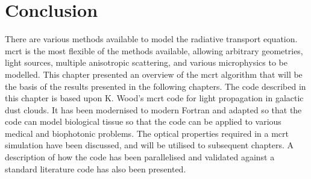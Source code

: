 \section{Conclusion}

There are various methods available to model the radiative transport equation.
\Gls*{mcrt} is the most flexible of the methods available, allowing arbitrary geometries, light sources, multiple anisotropic scattering, and various microphysics to be modelled.
This chapter presented an overview of the \gls*{mcrt} algorithm that will be the basis of the results presented in the following chapters.
The code described in this chapter is based upon K. Wood's \gls{mcrt} code for light propagation in galactic dust clouds.
It has been modernised to modern Fortran and adapted so that the code can model biological tissue so that the code can be applied to various medical and biophotonic problems.
The optical properties required in a \gls*{mcrt} simulation have been discussed, and will be utilised to subsequent chapters.
A description of how the code has been parallelised and validated against a standard literature code has also been presented.
